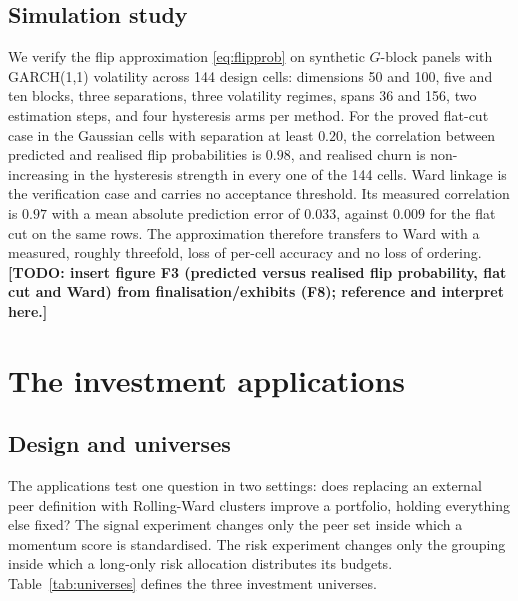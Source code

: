 \documentclass{rQUF2e}
\theoremstyle{plain}
\theoremstyle{remark}
\newcommand{\TODO}[1]{\textbf{[TODO: #1]}}
\begin{document}
\subsection{Simulation study}
\label{sec:simulation}

We verify the flip approximation \eqref{eq:flipprob} on synthetic $G$-block
panels with GARCH(1,1) volatility across 144 design cells: dimensions 50 and
100, five and ten blocks, three separations, three volatility regimes, spans
36 and 156, two estimation steps, and four hysteresis arms per method. For the proved flat-cut case in the Gaussian
cells with separation at least $0.20$, the correlation between predicted and
realised flip probabilities is $0.98$, and realised churn is non-increasing
in the hysteresis strength in every one of the 144 cells. Ward linkage is
the verification case and carries no acceptance threshold. Its measured
correlation is $0.97$ with a mean absolute prediction error of $0.033$,
against $0.009$ for the flat cut on the same rows. The approximation
therefore transfers to Ward with a measured, roughly threefold, loss of
per-cell accuracy and no loss of ordering.
\TODO{insert figure F3 (predicted versus realised flip probability, flat cut
and Ward) from finalisation/exhibits (F8); reference and interpret here.}

\section{The investment applications}
\label{sec:applications}

\subsection{Design and universes}
\label{sec:design}

The applications test one question in two settings: does replacing an external
peer definition with Rolling-Ward clusters improve a portfolio, holding
everything else fixed? The signal experiment changes only the peer set inside
which a momentum score is standardised. The risk experiment changes only the
grouping inside which a long-only risk allocation distributes its budgets.
Table~\ref{tab:universes} defines the three investment universes.
\end{document}
